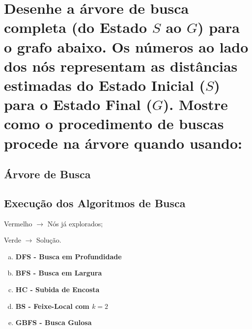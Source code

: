 \documentclass[paper=a4, fontsize=11pt]{scrartcl} %
\begin{document}
    
    \section{Desenhe a árvore de busca completa (do Estado $S$ ao $G$) para o grafo abaixo. Os números ao lado dos nós representam as distâncias estimadas do Estado Inicial ($S$) para o Estado Final ($G$). Mostre como o procedimento de buscas procede na árvore quando usando:}
    

    \subsection{Árvore de Busca}
    

    \subsection{Execução dos Algoritmos de Busca}
    \par Vermelho $\rightarrow$ Nós já explorados; 
    \par Verde $\rightarrow$ Solução.

    \begin{enumerate}[(a)]
        \item \textbf{DFS - Busca em Profundidade}
        \par 
        \vspace{0.2cm}

        \item \textbf{BFS - Busca em Largura}
        \par 
        \vspace{0.2cm}

        \item \textbf{HC - Subida de Encosta}
        \par 
        \vspace{0.2cm}

        \item \textbf{BS - Feixe-Local com $k=2$}
        \par 
        \vspace{0.2cm}

        \pagebreak
        \item \textbf{GBFS - Busca Gulosa}
        \par 
        \vspace{0.2cm}


    \end{enumerate}
\end{document}
